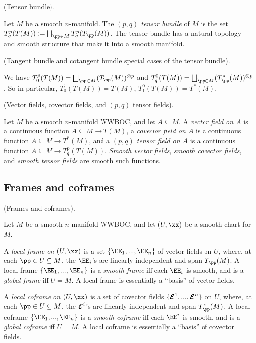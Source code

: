 \begin{defn}
     (Tensor bundle).
    
    Let $M$ be a smooth $n$-manifold. The \textit{$(p, q)$ tensor bundle} of $M$ is the set $T^p_q(T(M)) := \bigsqcup_{\pp \in M} T^p_q(T_\pp(M))$. The tensor bundle has a natural topology and smooth structure that make it into a smooth manifold.
\end{defn}

\begin{remark}
     (Tangent bundle and cotangent bundle special cases of the tensor bundle).
    
    We have $T^p_0(T(M)) = \bigsqcup_{\pp \in M} (T_\pp(M))^{\otimes p}$ and $T^0_q(T(M)) = \bigsqcup_{\pp \in M} (T_\pp^*(M))^{\otimes p}$. So in particular, $T^1_0(T(M)) = T(M)$, $T^0_1(T(M)) = T^*(M)$.
    
\end{remark}

\begin{defn}
     (Vector fields, covector fields, and $(p, q)$ tensor fields).
    
    Let $M$ be a smooth $n$-manifold WWBOC, and let $A \subseteq M$. A \textit{vector field on $A$} is a continuous function $A \subseteq M \rightarrow T(M)$, a \textit{covector field on $A$} is a continuous function $A \subseteq M \rightarrow T^*(M)$, and a \textit{$(p, q)$ tensor field on $A$} is a continuous function $A \subseteq M \rightarrow T^p_q(T(M))$. \textit{Smooth vector fields}, \textit{smooth covector fields}, and \textit{smooth tensor fields} are smooth such functions.
\end{defn}

\subsection*{Frames and coframes}

\begin{defn}
     (Frames and coframes).
    
    Let $M$ be a smooth $n$-manifold WWBOC, and let $(U, \xx)$ be a smooth chart for $M$.
    
    A \textit{local frame on $(U, \xx)$} is a set $\{\EE_1, ..., \EE_n\}$ of vector fields on $U$, where, at each $\pp \in U \subseteq M$, the $\EE_i$'s are linearly independent and span $T_\pp(M)$. A local frame $\{\EE_1, ..., \EE_n\}$ is a \textit{smooth frame} iff each $\EE_i$ is smooth, and is a \textit{global frame} iff $U = M$. A local frame is essentially a ``basis'' of vector fields.
    
    A \textit{local coframe on $(U, \xx)$} is a set of covector fields $\{\boldsymbol{\mathcal{E}}^1, ..., \boldsymbol{\mathcal{E}}^n\}$ on $U$, where, at each $\pp \in U \subseteq M$, the $\boldsymbol{\mathcal{E}}^i$'s are linearly independent and span $T_\pp^*(M)$. A local coframe $\{\EE_1, ..., \EE_n\}$ is a \textit{smooth coframe} iff each $\EE^i$ is smooth, and is a \textit{global coframe} iff $U = M$. A local coframe is essentially a ``basis'' of covector fields.
\end{defn}

